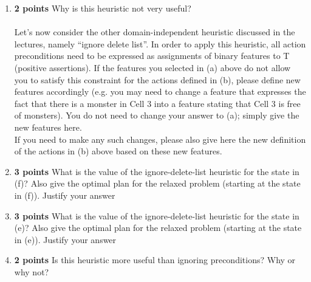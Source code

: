 \documentclass{article}
\begin{document}
\begin{enumerate}[label=(\alph*)]
    \item \textbf{2 points} Why is this heuristic not very useful? 
    \\ \\ Let’s now consider the other domain-independent heuristic discussed in the lectures, namely “ignore delete list”. In order to apply this heuristic, all action preconditions need to be expressed as assignments of binary features to T (positive assertions). If the features you selected in (a) above do not allow you to satisfy this constraint for the actions defined in (b), please define new features accordingly (e.g. you may need to change a feature that expresses the fact that there is a monster in Cell 3 into a feature stating that Cell 3 is free of monsters). You do not need to change your answer to (a); simply give the new features here.
    \\ If you need to make any such changes, please also give here the new definition of the actions in (b) above based on these new features. \\
    \item \textbf{3 points} What is the value of the ignore-delete-list heuristic for the state in (f)? Also give the optimal plan for the relaxed problem (starting at the state in (f)). Justify your answer
    \item \textbf{3 points} What is the value of the ignore-delete-list heuristic for the state in (e)? Also give the optimal plan for the relaxed problem (starting at the state in (e)). Justify your answer
    \item \textbf{2 points} Is this heuristic more useful than ignoring preconditions? Why or why not?
\end{enumerate}

\clearpage
\end{document}
